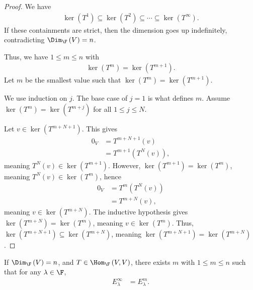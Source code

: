 \documentclass[10pt]{mypackage}
\begin{document}
\begin{proof}
  We have
  \begin{align*}
    \ker\left(T^{1}\right)\subseteq \ker\left(T^{2}\right)\subseteq \cdots \subseteq \ker\left(T^{\infty}\right).
  \end{align*}
  If these containments are strict, then the dimension goes up indefinitely, contradicting $\Dim_{\F}\left(V\right) = n$.\newline

  Thus, we have $1 \leq m \leq n$ with
  \begin{align*}
    \ker\left(T^{m}\right) = \ker\left(T^{m+1}\right).
  \end{align*}
  Let $m$ be the smallest value such that $\ker\left(T^{m}\right) = \ker\left(T^{m+1}\right)$.\newline

  We use induction on $j$. The base case of $j = 1$ is what defines $m$. Assume $\ker\left(T^{m}\right) = \ker\left(T^{m+j}\right)$ for all $1 \leq j \leq N$.\newline

  Let $v\in \ker\left(T^{m+N+1}\right)$. This gives 
  \begin{align*}
    0_V &= T^{m+N+1}\left(v\right)\\
        &= T^{m+1}\left(T^{N}\left(v\right)\right),
  \end{align*}
  meaning $T^N(v)\in \ker\left(T^{m+1}\right)$. However, $\ker\left(T^{m+1}\right) = \ker\left(T^{m}\right)$, meaning $T^{N}\left(v\right) \in \ker\left(T^{m}\right)$, hence
  \begin{align*}
    0_V &= T^{m}\left(T^{N}(v)\right)\\
        &= T^{m+N}\left(v\right),
  \end{align*}
  meaning $v\in \ker\left(T^{m+N}\right)$. The inductive hypothesis gives $\ker\left(T^{m+N}\right) = \ker\left(T^{m}\right)$, meaning $v\in \ker\left(T^{m}\right)$. Thus, $\ker\left(T^{m+N+1}\right)\subseteq \ker\left(T^{m+N}\right)$, meaning $\ker\left(T^{m+N+1}\right) = \ker\left(T^{m+N}\right)$.
\end{proof}
\begin{corollary}
  If $\Dim_{\F}\left(V\right) = n$, and $T\in \Hom_{\F}\left(V,V\right)$, there exists $m$ with $1 \leq m \leq n$ such that for any $\lambda \in \F$,
  \begin{align*}
    E_{\lambda}^{\infty} &= E_{\lambda}^{m}.
  \end{align*}
\end{corollary}
\end{document}
